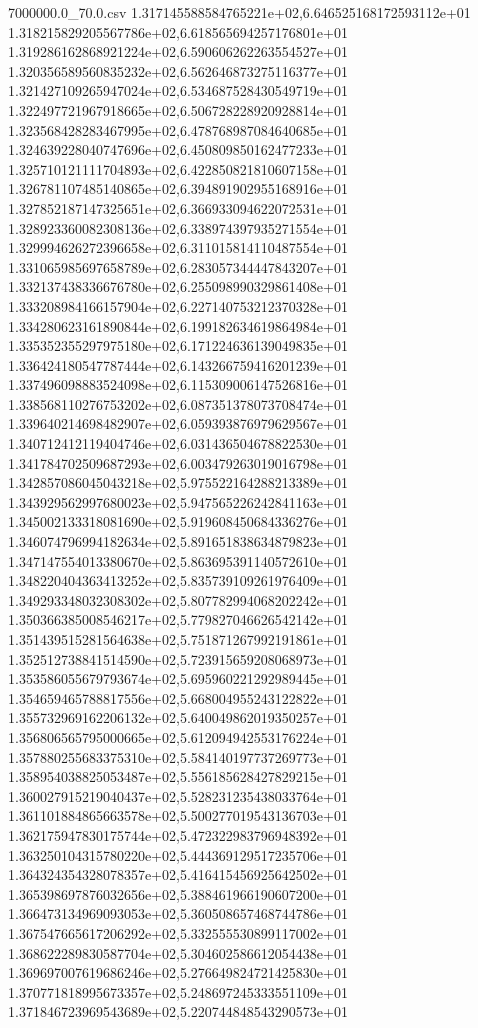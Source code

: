 \begin{filecontents*}{7000000.0_70.0.csv}
1.317145588584765221e+02,6.646525168172593112e+01
1.318215829205567786e+02,6.618565694257176801e+01
1.319286162868921224e+02,6.590606262263554527e+01
1.320356589560835232e+02,6.562646873275116377e+01
1.321427109265947024e+02,6.534687528430549719e+01
1.322497721967918665e+02,6.506728228920928814e+01
1.323568428283467995e+02,6.478768987084640685e+01
1.324639228040747696e+02,6.450809850162477233e+01
1.325710121111704893e+02,6.422850821810607158e+01
1.326781107485140865e+02,6.394891902955168916e+01
1.327852187147325651e+02,6.366933094622072531e+01
1.328923360082308136e+02,6.338974397935271554e+01
1.329994626272396658e+02,6.311015814110487554e+01
1.331065985697658789e+02,6.283057344447843207e+01
1.332137438336676780e+02,6.255098990329861408e+01
1.333208984166157904e+02,6.227140753212370328e+01
1.334280623161890844e+02,6.199182634619864984e+01
1.335352355297975180e+02,6.171224636139049835e+01
1.336424180547787444e+02,6.143266759416201239e+01
1.337496098883524098e+02,6.115309006147526816e+01
1.338568110276753202e+02,6.087351378073708474e+01
1.339640214698482907e+02,6.059393876979629567e+01
1.340712412119404746e+02,6.031436504678822530e+01
1.341784702509687293e+02,6.003479263019016798e+01
1.342857086045043218e+02,5.975522164288213389e+01
1.343929562997680023e+02,5.947565226242841163e+01
1.345002133318081690e+02,5.919608450684336276e+01
1.346074796994182634e+02,5.891651838634879823e+01
1.347147554013380670e+02,5.863695391140572610e+01
1.348220404363413252e+02,5.835739109261976409e+01
1.349293348032308302e+02,5.807782994068202242e+01
1.350366385008546217e+02,5.779827046626542142e+01
1.351439515281564638e+02,5.751871267992191861e+01
1.352512738841514590e+02,5.723915659208068973e+01
1.353586055679793674e+02,5.695960221292989445e+01
1.354659465788817556e+02,5.668004955243122822e+01
1.355732969162206132e+02,5.640049862019350257e+01
1.356806565795000665e+02,5.612094942553176224e+01
1.357880255683375310e+02,5.584140197737269773e+01
1.358954038825053487e+02,5.556185628427829215e+01
1.360027915219040437e+02,5.528231235438033764e+01
1.361101884865663578e+02,5.500277019543136703e+01
1.362175947830175744e+02,5.472322983796948392e+01
1.363250104315780220e+02,5.444369129517235706e+01
1.364324354328078357e+02,5.416415456925642502e+01
1.365398697876032656e+02,5.388461966190607200e+01
1.366473134969093053e+02,5.360508657468744786e+01
1.367547665617206292e+02,5.332555530899117002e+01
1.368622289830587704e+02,5.304602586612054438e+01
1.369697007619686246e+02,5.276649824721425830e+01
1.370771818995673357e+02,5.248697245333551109e+01
1.371846723969543689e+02,5.220744848543290573e+01

\end{filecontents*}
